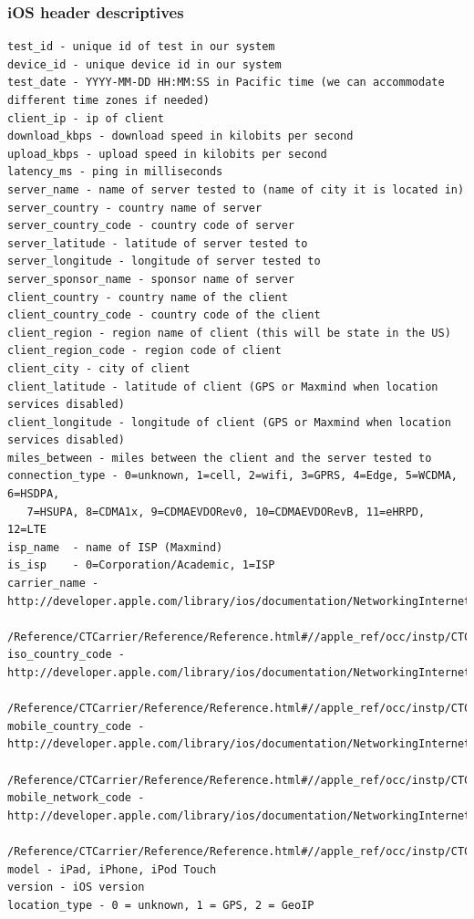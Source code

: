 \documentclass[]{article}
\begin{document}
\normalsize

\subsubsection{iOS header descriptives}\label{ios-header-descriptives}

\footnotesize

\begin{verbatim}
test_id - unique id of test in our system
device_id - unique device id in our system
test_date - YYYY-MM-DD HH:MM:SS in Pacific time (we can accommodate different time zones if needed)
client_ip - ip of client 
download_kbps - download speed in kilobits per second
upload_kbps - upload speed in kilobits per second
latency_ms - ping in milliseconds
server_name - name of server tested to (name of city it is located in)
server_country - country name of server
server_country_code - country code of server
server_latitude - latitude of server tested to
server_longitude - longitude of server tested to
server_sponsor_name - sponsor name of server
client_country - country name of the client
client_country_code - country code of the client
client_region - region name of client (this will be state in the US)
client_region_code - region code of client
client_city - city of client
client_latitude - latitude of client (GPS or Maxmind when location services disabled)
client_longitude - longitude of client (GPS or Maxmind when location services disabled)
miles_between - miles between the client and the server tested to
connection_type - 0=unknown, 1=cell, 2=wifi, 3=GPRS, 4=Edge, 5=WCDMA, 6=HSDPA, 
   7=HSUPA, 8=CDMA1x, 9=CDMAEVDORev0, 10=CDMAEVDORevB, 11=eHRPD, 12=LTE 
isp_name  - name of ISP (Maxmind) 
is_isp    - 0=Corporation/Academic, 1=ISP
carrier_name - http://developer.apple.com/library/ios/documentation/NetworkingInternet
   /Reference/CTCarrier/Reference/Reference.html#//apple_ref/occ/instp/CTCarrier/carrierName 
iso_country_code - http://developer.apple.com/library/ios/documentation/NetworkingInternet
   /Reference/CTCarrier/Reference/Reference.html#//apple_ref/occ/instp/CTCarrier/isoCountryCode 
mobile_country_code - http://developer.apple.com/library/ios/documentation/NetworkingInternet
   /Reference/CTCarrier/Reference/Reference.html#//apple_ref/occ/instp/CTCarrier/mobileCountryCode 
mobile_network_code - http://developer.apple.com/library/ios/documentation/NetworkingInternet
   /Reference/CTCarrier/Reference/Reference.html#//apple_ref/occ/instp/CTCarrier/mobileNetworkCode
model - iPad, iPhone, iPod Touch 
version - iOS version
location_type - 0 = unknown, 1 = GPS, 2 = GeoIP
\end{verbatim}
\end{document}
